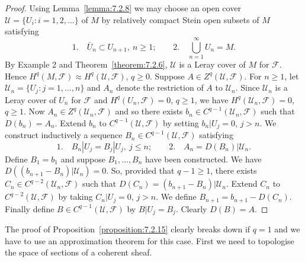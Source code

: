 \begin{proof}
Using Lemma~\ref{lemma:7.2.8} we may choose an open cover $\mathcal U=\{U_i:i=1,2,\ldots\}$ of $M$ by relatively compact Stein open subsets of $M$ satisfying
\[
1.\quad\bar U_n\subset U_{n+1},\ n\geq1;\qquad2.\quad\bigcup_{n=1}^\infty U_n=M.
\]
By Example 2 and Theorem~\ref{theorem:7.2.6}, $\mathcal U$ is a Leray cover of $M$ for $\mathcal F$. Hence $H^q(M,\mathcal F)\approx H^q(\mathcal U,\mathcal F)$, $q\geq0$. Suppose $A\in Z^q(\mathcal U,\mathcal F)$. For $n\geq1$, let $\mathcal U_n=\{U_j:j=1,\ldots,n\}$ and $A_n$ denote the restriction of $A$ to $\mathcal U_n$. Since $\mathcal U_n$ is a Leray cover of $U_n$ for $\mathcal F$ and $H^q(U_n,\mathcal F)=0$, $q\geq1$, we
have $H^q(\mathcal U_n,\mathcal F)=0$, $q\geq1$. Now $A_n\in Z^q(\mathcal U_n,\mathcal F)$ and so there exists $b_n\in C^{q-1}(\mathcal U_n,\mathcal F)$ such that $D(b_n)=A_n$. Extend $b_n$ to $C^{q-1}(\mathcal U,\mathcal F)$ by setting $b_n|U_j=0$, $j>n$. We construct inductively a sequence $B_n\in C^{q-1}(\mathcal U,\mathcal F)$ satisfying
\[
1.\quad B_n|U_j=B_j|U_j,\ j\leq n;\qquad2.\quad A_n=D(B_n)|\mathcal U_n.
\]
Define $B_1=b_1$ and suppose $B_1,\ldots,B_n$ have been constructed. We have $D((b_{n+1}-B_n)|\mathcal U_n)=0$. So, provided that $q-1\geq1$, there exists $C_n\in C^{q-2}(\mathcal U_n,\mathcal F)$ such that $D(C_n)=(b_{n+1}-B_n)|\mathcal U_n$. Extend $C_n$ to $C^{q-2}(\mathcal U,\mathcal F)$ by taking $C_n|U_j=0$, $j>n$. We define $B_{n+1}=b_{n+1}-D(C_n)$. Finally define $B\in C^{q-1}(\mathcal U,\mathcal F)$ by $B|U_j=B_j$. Clearly $D(B)=A$.
\end{proof}
The proof of Proposition~\ref{proposition:7.2.15} clearly breaks down if $q=1$ and we have to use an approximation theorem for this case. First we need to topologise the space of sections of a coherent sheaf.

